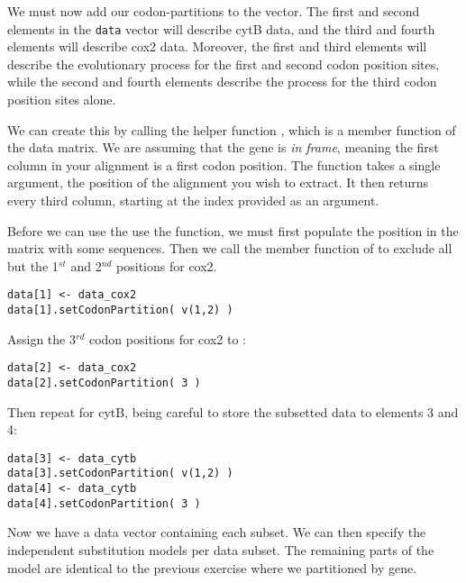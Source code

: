 We must now add our codon-partitions to the  vector.
The first and second elements in the {\tt data} vector will describe cytB data, and the third and fourth elements will describe cox2 data.
Moreover, the first and third elements will describe the evolutionary process for the first and second codon position sites, while the second and fourth elements describe the process for the third codon position sites alone.

We can create this by calling the helper function , which is a member function of the data matrix. 
We are assuming that the gene is \textit{in frame}, meaning the first column in your alignment is a first codon position. 
The  function takes a single argument, the position of the alignment you wish to extract. 
It then returns every third column, starting at the index provided as an argument.

Before we can use the use the  function, we must first populate the position in the  matrix with some sequences. 
Then we call the member function of  to exclude all but the 1$^{st}$ and 2$^{nd}$ positions for cox2.
{\tt \begin{snugshade*}
\begin{lstlisting}
data[1] <- data_cox2
data[1].setCodonPartition( v(1,2) )
\end{lstlisting}
\end{snugshade*}}

Assign the 3$^{rd}$ codon positions for cox2 to :
{\tt \begin{snugshade*}
\begin{lstlisting}
data[2] <- data_cox2
data[2].setCodonPartition( 3 )
\end{lstlisting}
\end{snugshade*}}

Then repeat for cytB, being careful to store the subsetted data to elements 3 and 4:
{\tt \begin{snugshade*}
\begin{lstlisting}
data[3] <- data_cytb
data[3].setCodonPartition( v(1,2) )
data[4] <- data_cytb
data[4].setCodonPartition( 3 )
\end{lstlisting}
\end{snugshade*}}

Now we have a data vector containing each subset.
We can then specify the independent substitution models per data subset.
The remaining parts of the model are identical to the previous exercise where we partitioned by gene.


